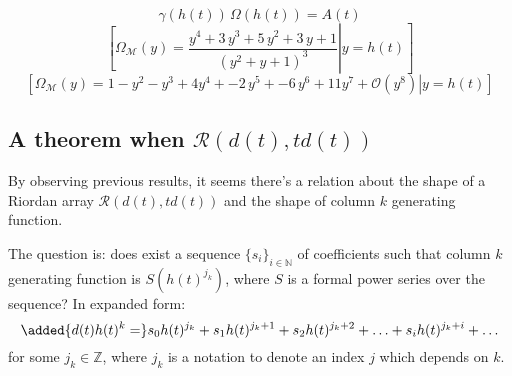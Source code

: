 \documentclass[11pt,a4paper]{article} %
\begin{document}
    \begin{displaymath}
        \gamma(h(t))\,\Omega(h(t)) = A(t) 
    \end{displaymath}
    \begin{displaymath}
            \left.\left[
                \Omega_{\mathcal{M}}(y) = \frac{y^{4} + 3 \, y^{3} + 5 \, y^{2} + 3 \, y + 1}{{\left(y^{2} + y + 1\right)}^{3}}
                    \right| y = h(t) \right]
    \end{displaymath}
    \begin{displaymath}
            \left.\left[
                \Omega_{\mathcal{M}}(y) = 1 -y^{2} -y^{3} + 4 y^{4} + -2\,y^{5} 
                    + -6\,y^{6} + 11 y^{7}+\mathcal{O}\left(y^{8}\right)
                    \right| y = h(t) \right]
    \end{displaymath}

    \subsection{A theorem when $\mathcal{R}(d(t), td(t))$}

    By observing previous results, it seems there's a relation
    about the shape of a Riordan array $\mathcal{R}(d(t), td(t))$ 
    and the shape of column $k$ generating function. 
    
    The question is: does exist a sequence $\lbrace s_i \rbrace_{i \in \mathbb{N}}$ 
    of coefficients such that column $k$ generating function is $S(h(t)^{j_k})$, where $S$
    is a formal power series over the sequence? In expanded form: 
    \begin{displaymath}
        \added{d(t)h(t)^k = }s_0h(t)^{j_k} + s_1 h(t)^{j_k+1} + s_2 h(t)^{j_k+2} + 
            \ldots + s_i h(t)^{j_k+i} + \ldots
    \end{displaymath}
    for some $j_k \in \mathbb{Z}$, where $j_k$ is a notation to denote an index $j$ 
    which depends on $k$.
\end{document}
